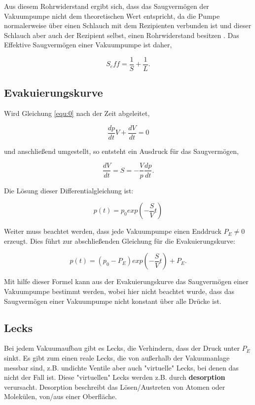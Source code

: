 Aus diesem Rohrwiderstand ergibt sich, dass das Saugvermögen der Vakuumpumpe nicht dem theoretischen Wert entspricht, 
da die Pumpe normalerweise über einen Schlauch mit dem Rezipienten verbunden ist und dieser Schlauch aber auch der Rezipient selbst, 
einen Rohrwiderstand besitzen \cite{Buch, S82}.
Das Effektive Saugvermögen einer Vakuumpumpe ist daher,

    \begin{equation}
    \label{equ:9}
        S_eff = \frac{1}{S} + \frac{1}{L}.
    \end{equation}


\subsection{Evakuierungskurve}
Wird Gleichung \ref{equ:0} nach der Zeit abgeleitet, 

    \begin{equation}
    \label{equ:10}
        \frac{dp}{dt} V + \frac{dV}{dt} = 0
    \end{equation}

und anschließend umgestellt, so entsteht ein Ausdruck für das Saugvermögen,

    \begin{equation}
    \label{equ:11}
        \frac{dV}{dt} = S = - \frac{V}{p} \frac{dp}{dt}.
    \end{equation}

Die Lösung dieser Differentialgleichung ist:

    \begin{equation}
    \label{equ:12}
        p(t) = p_0 exp(- \frac{S}{V}t)
    \end{equation}

Weiter muss beachtet werden, dass jede Vakuumpumpe einen Enddruck $P_E \neq 0$ erzeugt. 
Dies führt zur abschließenden Gleichung für die Evakuierungskurve:

    \begin{equation}
    \label{equ:13}
        p(t) = (p_0 - P_E) exp(- \frac{S}{V} t) + P_E.
    \end{equation}

Mit hilfe dieser Formel kann aus der Evakuierungskurve das Saugvermögen einer Vakuumpumpe bestimmt werden,
wobei hier nicht beachtet wurde, dass das Saugvermögen einer Vakuumpumpe nicht konstant über alle Drücke ist.


\subsection{Lecks}
Bei jedem Vakuumaufbau gibt es Lecks, die Verhindern, dass der Druck unter $P_E$ sinkt.
Es gibt zum einen reale Lecks, die von außerhalb der Vakuumanlage messbar sind, z.B. undichte Ventile 
aber auch "virtuelle" Lecks, bei denen das nicht der Fall ist.
Diese "virtuellen" Lecks werden z.B. durch \textbf{desorption} verursacht.
Desorption beschreibt das Lösen/Austreten von Atomen oder Molekülen, von/aus einer Oberfläche.

